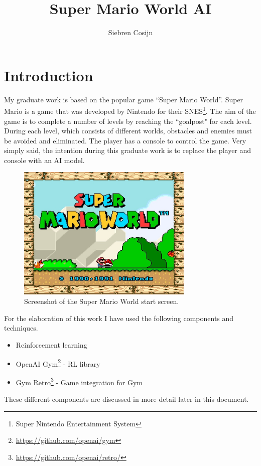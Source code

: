 \documentclass[11pt,a4paper]{article}
\title{Super Mario World AI}
\author{Siebren Cosijn}
\date{\displaydate{date}}
\begin{document}
\maketitle

\section{Introduction}
My graduate work is based on the popular game ``Super Mario World''.
Super Mario is a game that was developed by Nintendo for their SNES\footnote{Super Nintendo Entertainment System}.
The aim of the game is to complete a number of levels by reaching the “goalpost" for each level.
During each level, which consists of different worlds, obstacles and enemies must be avoided and eliminated.
The player has a console to control the game.
Very simply said, the intention during this graduate work is to replace the player and console with an AI model.

\begin{figure}[htbp]
    \centering
    \includegraphics[width=0.75\textwidth]{start-screen}
    \caption{Screenshot of the Super Mario World start screen.}
    \label{fig:smw}
\end{figure}

For the elaboration of this work I have used the following components and techniques.
\begin{itemize}
    \item Reinforcement learning
    \item OpenAI Gym\footnote{\url{https://github.com/openai/gym}} \cite{brockman2016openai} - RL library
    \item Gym Retro\footnote{\url{https://github.com/openai/retro/}} - Game integration for Gym
\end{itemize}
These different components are discussed in more detail later in this document.
\end{document}
